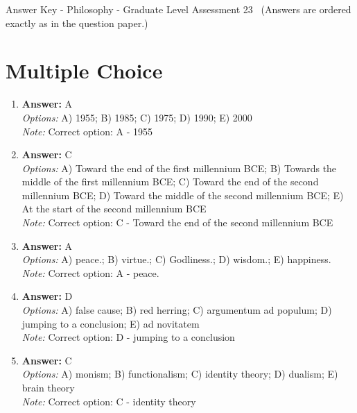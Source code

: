 \documentclass[12pt]{article}
\begin{document}
\begin{center}
Answer Key - Philosophy - Graduate Level Assessment 23 \
\small (Answers are ordered exactly as in the question paper.)
\end{center}

\section*{Multiple Choice}
\begin{enumerate}[label=\arabic*.]
\item \textbf{Answer:} A
\\ \textit{Options:} A) 1955; B) 1985; C) 1975; D) 1990; E) 2000
\\ \textit{Note:} Correct option: A - 1955
\item \textbf{Answer:} C
\\ \textit{Options:} A) Toward the end of the first millennium BCE; B) Towards the middle of the first millennium BCE; C) Toward the end of the second millennium BCE; D) Toward the middle of the second millennium BCE; E) At the start of the second millennium BCE
\\ \textit{Note:} Correct option: C - Toward the end of the second millennium BCE
\item \textbf{Answer:} A
\\ \textit{Options:} A) peace.; B) virtue.; C) Godliness.; D) wisdom.; E) happiness.
\\ \textit{Note:} Correct option: A - peace.
\item \textbf{Answer:} D
\\ \textit{Options:} A) false cause; B) red herring; C) argumentum ad populum; D) jumping to a conclusion; E) ad novitatem
\\ \textit{Note:} Correct option: D - jumping to a conclusion
\item \textbf{Answer:} C
\\ \textit{Options:} A) monism; B) functionalism; C) identity theory; D) dualism; E) brain theory
\\ \textit{Note:} Correct option: C - identity theory
\end{enumerate}
\end{document}
